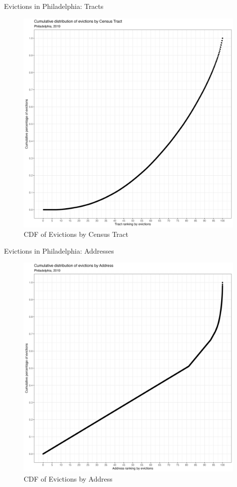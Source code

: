 \documentclass[10pt, xcolor=dvipsnames]{beamer}
\begin{document}
\begin{frame}{Evictions in Philadelphia: Tracts}
\begin{figure}
    \centering
    \includegraphics[width=0.6\linewidth]{figs/cumulative_evict_dist.png}
    \caption{CDF of Evictions by Census Tract}
    \label{fig:cum-tract}
\end{figure}
    
\end{frame}

\begin{frame}{Evictions in Philadelphia: Addresses}
\begin{figure}
    \centering
    \includegraphics[width=0.6\linewidth]{figs/cumulative_evict_dist_address_hist.png}
    \caption{CDF of Evictions by Address}
    \label{fig:cum-address}
\end{figure}
    
\end{frame}
\end{document}
